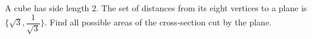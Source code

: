 A cube has side length $2$. The set of distances from its eight vertices to a plane is $\{\sqrt3,\dfrac{1}{\sqrt3}\}$. Find all possible areas of the cross-section cut by the plane.

